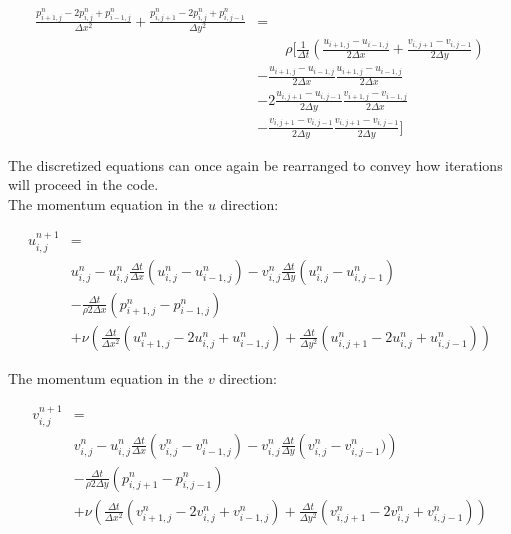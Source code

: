 \documentclass{article}
\begin{document}
\begin{equation}
	\begin{aligned}
		\frac{p_{i+1,j}^{n}-2p_{i,j}^{n}+p_{i-1,j}^{n}}{\Delta
		x^2}+\frac{p_{i,j+1}^{n}-2p_{i,j}^{n}+p_{i,j-1}^{n}}{\Delta
		y^2} & = \\
		     & \qquad \rho \biggr[ \frac{1}{\Delta
			t}\left(\frac{u_{i+1,j}-u_{i-1,j}}{2\Delta
			x}+\frac{v_{i,j+1}-v_{i,j-1}}{2\Delta y}\right) \\
		    & -\frac{u_{i+1,j}-u_{i-1,j}}{2\Delta
		x}\frac{u_{i+1,j}-u_{i-1,j}}{2\Delta x}	\\
		& - 2\frac{u_{i,j+1}-u_{i,j-1}}{2\Delta
		y}\frac{v_{i+1,j}-v_{i-1,j}}{2\Delta x} \\
		& - \frac{v_{i,j+1}-v_{i,j-1}}{2\Delta
		y}\frac{v_{i,j+1}-v_{i,j-1}}{2\Delta y} \biggr]
	\end{aligned}
\end{equation}

\noindent The discretized equations can once again be rearranged to convey
how iterations will proceed in the code.\\

\noindent  The momentum equation in the $u$ direction:

\begin{equation}
	\begin{aligned}
		u_{i,j}^{n+1} & =
		\\
		              & u_{i,j}^{n} - u_{i,j}^{n} \frac{\Delta
			t}{\Delta x}
		\left(u_{i,j}^{n}-u_{i-1,j}^{n}\right) - v_{i,j}^{n}
		\frac{\Delta t}{\Delta y}
		\left(u_{i,j}^{n}-u_{i,j-1}^{n}\right)
		\\
		              & - \frac{\Delta t}{\rho 2\Delta x}
		\left(p_{i+1,j}^{n}-p_{i-1,j}^{n}\right)
		\\
		              & + \nu \left(\frac{\Delta t}{\Delta x^2}
		\left(u_{i+1,j}^{n}-2u_{i,j}^{n}+u_{i-1,j}^{n}\right) +
		\frac{\Delta t}{\Delta
				y^2}
		\left(u_{i,j+1}^{n}-2u_{i,j}^{n}+u_{i,j-1}^{n}\right)\right)
	\end{aligned}
\end{equation}

\noindent The momentum equation in the $v$ direction:

\begin{equation}
	\begin{aligned}
		v_{i,j}^{n+1} & =
		\\
		              & v_{i,j}^{n} - u_{i,j}^{n} \frac{\Delta
			t}{\Delta x}
		\left(v_{i,j}^{n}-v_{i-1,j}^{n}\right) - v_{i,j}^{n}
		\frac{\Delta t}{\Delta y}
		\left(v_{i,j}^{n}-v_{i,j-1}^{n})\right)
		\\
		              & - \frac{\Delta t}{\rho 2\Delta y}
		\left(p_{i,j+1}^{n}-p_{i,j-1}^{n}\right)
		\\
		              & + \nu \left(\frac{\Delta t}{\Delta x^2}
		\left(v_{i+1,j}^{n}-2v_{i,j}^{n}+v_{i-1,j}^{n}\right) +
		\frac{\Delta t}{\Delta
				y^2}
		\left(v_{i,j+1}^{n}-2v_{i,j}^{n}+v_{i,j-1}^{n}\right)\right)
	\end{aligned}
\end{equation}
\end{document}
